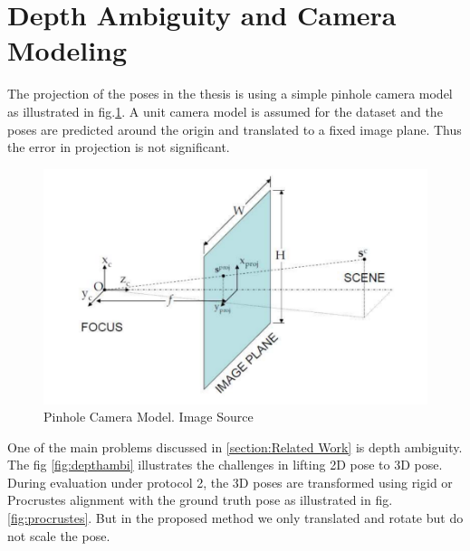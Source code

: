 \section{Depth Ambiguity and Camera Modeling}

The projection of the poses in the thesis is using a simple pinhole camera model as illustrated in fig.\ref{fig:pinhole}. A unit camera model is assumed for the dataset and the poses are predicted around the origin and translated to a fixed image plane. Thus the error in projection is not significant. 

\begin{figure}[!h]
    \centering
    \includegraphics[scale=0.4]{figures/background/pinhole.png}
    \caption{Pinhole Camera Model. Image Source \cite{pinhole}}
    \label{fig:pinhole}
\end{figure}

One of the main problems discussed in \ref{section:Related Work} is depth ambiguity. The fig \ref{fig:depthambi} illustrates the challenges in lifting 2D pose to 3D pose. During evaluation under protocol 2, the 3D poses are transformed using rigid or Procrustes alignment with the ground truth pose as illustrated in fig. \ref{fig:procrustes}. But in the proposed method we only translated and rotate but do not scale the pose.





